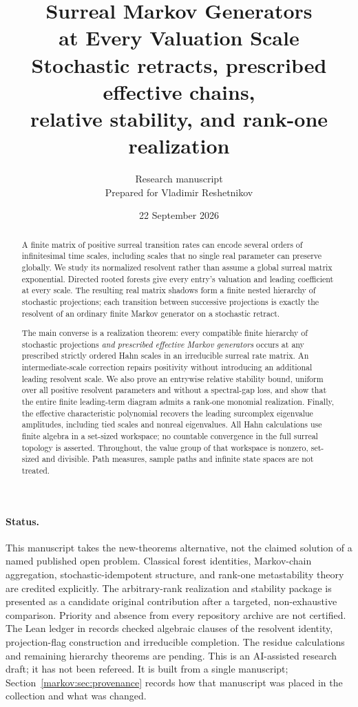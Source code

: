 \documentclass[11pt]{article}
\title{\textbf{Surreal Markov Generators\\at Every Valuation Scale}\\[0.5em]
\large Stochastic retracts, prescribed effective chains,\\
relative stability, and rank-one realization}
\author{Research manuscript\\Prepared for Vladimir Reshetnikov}
\date{22 September 2026}
\numberwithin{equation}{section}
\theoremstyle{definition}
\theoremstyle{remark}
\begin{document}
\maketitle
\thispagestyle{empty}

\begin{abstract}
A finite matrix of positive surreal transition rates can encode several orders of
infinitesimal time scales, including scales that no single real parameter can
preserve globally. We study its normalized resolvent rather than assume a global
surreal matrix exponential. Directed rooted forests give every entry's valuation
and leading coefficient at every scale. The resulting real matrix shadows form
a finite nested hierarchy of stochastic projections; each transition between
successive projections is exactly the resolvent of an ordinary finite Markov
generator on a stochastic retract.

The main converse is a realization theorem: every compatible finite hierarchy of
stochastic projections \emph{and prescribed effective Markov generators} occurs
at any prescribed strictly ordered Hahn scales in an irreducible surreal rate
matrix. An intermediate-scale correction repairs positivity without introducing
an additional leading resolvent scale. We also prove an entrywise relative
stability bound, uniform over all positive resolvent parameters and without a
spectral-gap loss, and show that the entire finite leading-term diagram admits a
rank-one monomial realization. Finally, the effective characteristic polynomial
recovers the leading surcomplex eigenvalue amplitudes, including tied scales and
nonreal eigenvalues. All Hahn calculations use finite algebra in a set-sized workspace;
no countable convergence in the full surreal topology is asserted.
Throughout, the value group of that workspace is nonzero, set-sized and
divisible. Path measures, sample paths and infinite state spaces are not
treated.
\end{abstract}

\paragraph{Status.}
This manuscript takes the new-theorems alternative, not the claimed solution of a
named published open problem. Classical forest identities, Markov-chain
aggregation, stochastic-idempotent structure, and rank-one metastability theory
are credited explicitly. The arbitrary-rank realization and stability package is
presented as a candidate original contribution after a targeted, non-exhaustive
comparison. Priority and absence from every repository archive are not certified.
The Lean ledger in  records checked algebraic
clauses of the resolvent identity, projection-flag construction and irreducible
completion. The residue calculations and remaining hierarchy theorems are
pending. This is an AI-assisted research draft; it has not been refereed.
It is built from a single manuscript;
Section~\ref{markov:sec:provenance} records how that manuscript was placed in
the collection and what was changed.
\end{document}
